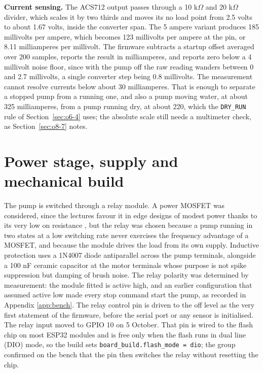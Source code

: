 \textbf{Current sensing.} The ACS712 output passes through a 10 k$\Omega$ and 20 k$\Omega$ divider, which scales it by two thirds and moves its no load point from 2.5 volts to about 1.67 volts, inside the converter span. The 5 ampere variant produces 185 millivolts per ampere, which becomes 123 millivolts per ampere at the pin, or 8.11 milliamperes per millivolt. The firmware subtracts a startup offset averaged over 200 samples, reports the result in milliamperes, and reports zero below a 4 millivolt noise floor, since with the pump off the raw reading wanders between 0 and 2.7 millivolts, a single converter step being 0.8 millivolts. The measurement cannot resolve currents below about 30 milliamperes. That is enough to separate a stopped pump from a running one, and also a pump moving water, at about 325 milliamperes, from a pump running dry, at about 220, which the \texttt{DRY\_RUN} rule of Section~\ref{sec:o6-4} uses; the absolute scale still needs a multimeter check, as Section~\ref{sec:o8-7} notes.

\section{Power stage, supply and mechanical build}
\label{sec:o3-4}

The pump is switched through a relay module. A power MOSFET was considered, since the lectures favour it in edge designs of modest power thanks to its very low on resistance \cite{slide01}, but the relay was chosen because a pump running in two states at a low switching rate never exercises the frequency advantage of a MOSFET, and because the module drives the load from its own supply. Inductive protection uses a 1N4007 diode antiparallel across the pump terminals, alongside a 100 nF ceramic capacitor at the motor terminals whose purpose is not spike suppression but damping of brush noise. The relay polarity was determined by measurement: the module fitted is active high, and an earlier configuration that assumed active low made every stop command start the pump, as recorded in Appendix \ref{app:bench}. The relay control pin is driven to the off level as the very first statement of the firmware, before the serial port or any sensor is initialised. The relay input moved to GPIO 10 on 5 October. That pin is wired to the flash chip on most ESP32 modules and is free only when the flash runs in dual line (DIO) mode, so the build sets \texttt{board\_build.flash\_mode = dio}; the group confirmed on the bench that the pin then switches the relay without resetting the chip.

